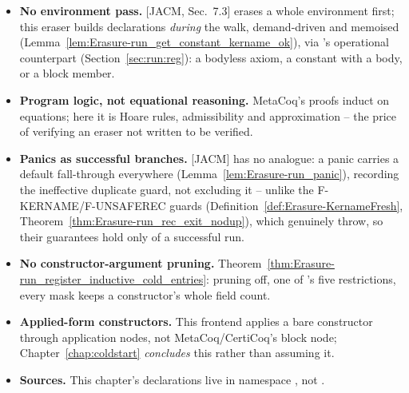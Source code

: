 \begin{itemize}
\item {} \textbf{No environment pass.} [JACM, Sec.~7.3] erases a whole environment first;
this eraser builds \lbox{} declarations \emph{during} the walk, demand-driven and memoised
(Lemma~\ref{lem:Erasure-run_get_constant_kername_ok}), via \ErasesEnv's operational counterpart
(Section~\ref{sec:run:reg}): a bodyless axiom, a constant with a body, or a block member.
\item {} \textbf{Program logic, not equational reasoning.} MetaCoq's proofs induct on
equations; here it is Hoare rules, admissibility and approximation -- the price of verifying an
eraser not written to be verified.
\item {} \textbf{Panics as successful branches.} [JACM] has no analogue: a panic carries a
default fall-through everywhere (Lemma~\ref{lem:Erasure-run_panic}), recording the ineffective
duplicate guard, not excluding it -- unlike the F-KERNAME/F-UNSAFEREC guards
(Definition~\ref{def:Erasure-KernameFresh}, Theorem~\ref{thm:Erasure-run_rec_exit_nodup}), which
genuinely throw, so their guarantees hold only of a successful run.
\item {} \textbf{No constructor-argument pruning.}
Theorem~\ref{thm:Erasure-run_register_inductive_cold_entries}: pruning off, one of
's five restrictions, every mask keeps a constructor's whole field count.
\item {} \textbf{Applied-form constructors.} This frontend applies a bare constructor
through application nodes, not MetaCoq/CertiCoq's block node; Chapter~\ref{chap:coldstart}
\emph{concludes} this rather than assuming it.
\item {} \textbf{Sources.} This chapter's declarations live in namespace ,
not .
\end{itemize}
